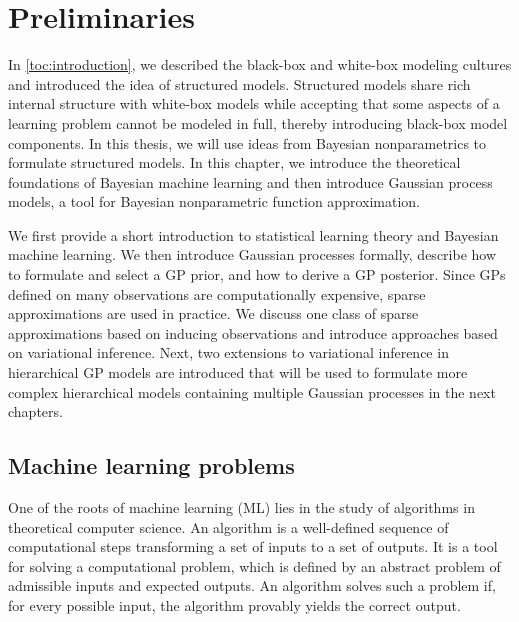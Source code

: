 \chapter{Preliminaries}
\label{toc:gp}
In \cref{toc:introduction}, we described the black-box and white-box modeling cultures and introduced the idea of structured models.
Structured models share rich internal structure with white-box models while accepting that some aspects of a learning problem cannot be modeled in full, thereby introducing black-box model components.
In this thesis, we will use ideas from Bayesian nonparametrics to formulate structured models.
In this chapter, we introduce the theoretical foundations of Bayesian machine learning and then introduce Gaussian process models, a tool for Bayesian nonparametric function approximation.

We first provide a short introduction to statistical learning theory and Bayesian machine learning.
We then introduce Gaussian processes formally, describe how to formulate and select a GP prior, and how to derive a GP posterior.
Since GPs defined on many observations are computationally expensive, sparse approximations are used in practice.
We discuss one class of sparse approximations based on inducing observations and introduce approaches based on variational inference.
Next, two extensions to variational inference in hierarchical GP models are introduced that will be used to formulate more complex hierarchical models containing multiple Gaussian processes in the next chapters.

\section{Machine learning problems}
\label{toc:bayesian_ml}
One of the roots of machine learning (ML) lies in the study of algorithms in theoretical computer science.
An algorithm is a well-defined sequence of computational steps transforming a set of inputs to a set of outputs.
It is a tool for solving a computational problem, which is defined by an abstract problem of admissible inputs and expected outputs.
An algorithm solves such a problem if, for every possible input, the algorithm provably yields the correct output.

